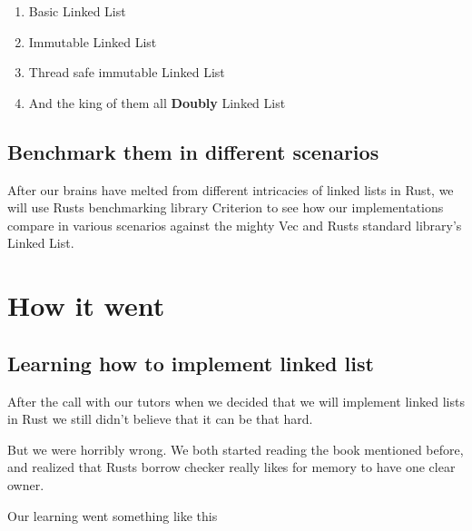 \documentclass[11pt,twoside,a4paper]{article}
\begin{document}
\begin{enumerate}
      \item Basic Linked List
      \item Immutable Linked List
      \item Thread safe immutable Linked List
      \item And the king of them all \textbf{Doubly} Linked List
\end{enumerate}

\subsection*{Benchmark them in different scenarios}

After our brains have melted from different intricacies of linked lists in Rust,
we will use Rusts benchmarking library Criterion \cite{docsCriterionRust} to
see how our implementations compare in various scenarios against the mighty
Vec and Rusts standard library's Linked List.

\section{How it went}

\subsection*{Learning how to implement linked list}

After the call with our tutors when we decided that we will implement linked
lists in Rust we still didn't believe that it can be that hard.

But we were horribly wrong. We both started reading the book mentioned before,
and realized that Rusts borrow checker really likes for memory to have one clear
owner.

Our learning went something like this
\end{document}
